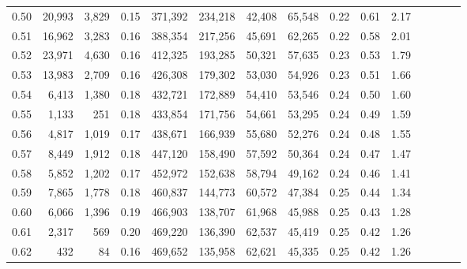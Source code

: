 \begin{tabular}{rrrcrrrrrrrrrrr}
0.50 &  20,993 &  3,829 &                                       0.15 &  371,392 &  234,218 &   42,408 &   65,548 &  0.22 &  0.61 &                         2.17 \\
0.51 &  16,962 &  3,283 &                                       0.16 &  388,354 &  217,256 &   45,691 &   62,265 &  0.22 &  0.58 &                         2.01 \\
0.52 &  23,971 &  4,630 &                                       0.16 &  412,325 &  193,285 &   50,321 &   57,635 &  0.23 &  0.53 &                         1.79 \\
0.53 &  13,983 &  2,709 &                                       0.16 &  426,308 &  179,302 &   53,030 &   54,926 &  0.23 &  0.51 &                         1.66 \\
0.54 &   6,413 &  1,380 &                                       0.18 &  432,721 &  172,889 &   54,410 &   53,546 &  0.24 &  0.50 &                         1.60 \\
0.55 &   1,133 &    251 &                                       0.18 &  433,854 &  171,756 &   54,661 &   53,295 &  0.24 &  0.49 &                         1.59 \\
0.56 &   4,817 &  1,019 &                                       0.17 &  438,671 &  166,939 &   55,680 &   52,276 &  0.24 &  0.48 &                         1.55 \\
0.57 &   8,449 &  1,912 &                                       0.18 &  447,120 &  158,490 &   57,592 &   50,364 &  0.24 &  0.47 &                         1.47 \\
0.58 &   5,852 &  1,202 &                                       0.17 &  452,972 &  152,638 &   58,794 &   49,162 &  0.24 &  0.46 &                         1.41 \\
0.59 &   7,865 &  1,778 &                                       0.18 &  460,837 &  144,773 &   60,572 &   47,384 &  0.25 &  0.44 &                         1.34 \\
0.60 &   6,066 &  1,396 &                                       0.19 &  466,903 &  138,707 &   61,968 &   45,988 &  0.25 &  0.43 &                         1.28 \\
0.61 &   2,317 &    569 &                                       0.20 &  469,220 &  136,390 &   62,537 &   45,419 &  0.25 &  0.42 &                         1.26 \\
0.62 &     432 &     84 &                                       0.16 &  469,652 &  135,958 &   62,621 &   45,335 &  0.25 &  0.42 &                         1.26 \\

\end{tabular}
